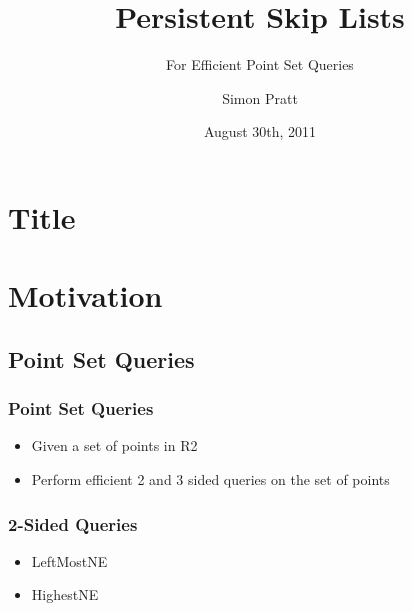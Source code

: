 \documentclass{beamer}
\title{Persistent Skip Lists}
\subtitle{For Efficient Point Set Queries}
\author{Simon Pratt}
\institute[Carleton University]
{
  Carleton University
}
\date{August 30th, 2011}
\begin{document}
\section{Title}
\begin{frame}
  \titlepage
\end{frame}




\section{Motivation}

\subsection{Point Set Queries}

\begin{frame}
  \frametitle{Point Set Queries}

  \begin{itemize}
  \item
    Given a set of points in R2
  \item
    Perform efficient 2 and 3 sided queries on the set of points
  \end{itemize}
\end{frame}

\begin{frame}
  \frametitle{2-Sided Queries}

  \begin{itemize}
  \item
    LeftMostNE
  \item
    HighestNE
  \end{itemize}

\end{frame}
\end{document}
